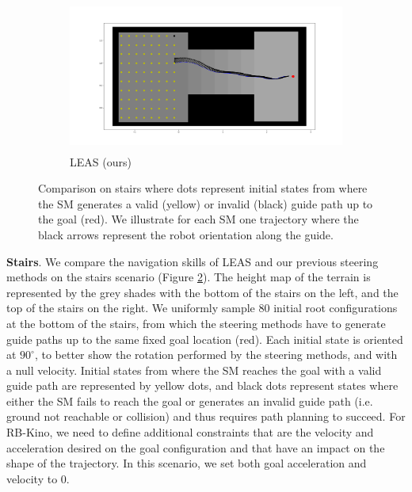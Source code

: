 \begin{figure}[ht]
    \begin{subfigure}[t]{0.49\linewidth}
    \includegraphics[width=\textwidth, height=5cm,trim={2cm 2cm 2cm 2cm},clip]{Figures/Chapter_LEAS/stairs_leas_p1_90.png}
    \caption{LEAS (ours)}
    \label{fig:leas:stairs_p1_leas}
    \end{subfigure}
    \caption{Comparison on stairs where dots represent initial states from where the SM generates a valid (yellow) or invalid (black) guide path up to the goal (red). We illustrate for each SM one trajectory where the black arrows represent the robot orientation along the guide.}
    \label{fig:stairs_p1}
\end{figure}

\hfill

\noindent\textbf{Stairs}. We compare the navigation skills of LEAS and our previous steering methods on the stairs scenario (Figure \ref{fig:stairs_p1}). The height map of the terrain is represented by the grey shades with the bottom of the stairs on the left, and the top of the stairs on the right. We uniformly sample 80 initial root configurations at the bottom of the stairs, from which the steering methods have to generate guide paths up to the same fixed goal location (red). Each initial state is oriented at $90^{\circ}$, to better show the rotation performed by the steering methods, and with a null velocity. 
Initial states from where the SM reaches the goal with a valid guide path are represented by yellow dots, and black dots represent states where either the SM fails to reach the goal or generates an invalid guide path (i.e. ground not reachable or collision) and thus requires path planning to succeed. 
For RB-Kino, we need to define additional constraints that are the velocity and acceleration desired on the goal configuration and that have an impact on the shape of the trajectory. In this scenario, we set both goal acceleration and velocity to $0$.

